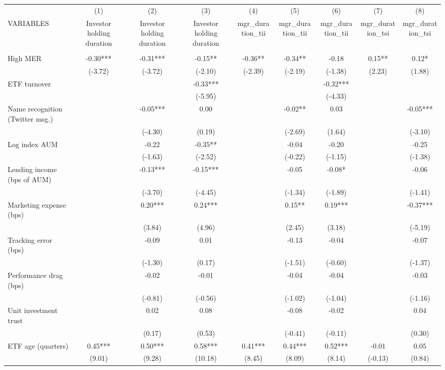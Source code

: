 \documentclass[]{article}
\begin{document}
\begin{tabular}{lcccccccc} \hline
 & (1) & (2) & (3) & (4) & (5) & (6) & (7) & (8) \\
VARIABLES & Investor holding duration & Investor holding duration & Investor holding duration & mgr\_duration\_tii & mgr\_duration\_tii & mgr\_duration\_tii & mgr\_duration\_tsi & mgr\_duration\_tsi \\ \hline
 &  &  &  &  &  &  &  &  \\
High MER & -0.30*** & -0.31*** & -0.15** & -0.36** & -0.34** & -0.18 & 0.15** & 0.12* \\
 & (-3.72) & (-3.72) & (-2.10) & (-2.39) & (-2.19) & (-1.38) & (2.23) & (1.88) \\
ETF turnover &  &  & -0.33*** &  &  & -0.32*** &  &  \\
 &  &  & (-5.95) &  &  & (-4.33) &  &  \\
Name recognition (Twitter msg.) &  & -0.05*** & 0.00 &  & -0.02** & 0.03 &  & -0.05*** \\
 &  & (-4.30) & (0.19) &  & (-2.69) & (1.64) &  & (-3.10) \\
Log index AUM &  & -0.22 & -0.35** &  & -0.04 & -0.20 &  & -0.25 \\
 &  & (-1.63) & (-2.52) &  & (-0.22) & (-1.15) &  & (-1.38) \\
Lending income (bps of AUM) &  & -0.13*** & -0.15*** &  & -0.05 & -0.08* &  & -0.06 \\
 &  & (-3.70) & (-4.45) &  & (-1.34) & (-1.89) &  & (-1.41) \\
Marketing expense (bps) &  & 0.20*** & 0.24*** &  & 0.15** & 0.19*** &  & -0.37*** \\
 &  & (3.84) & (4.96) &  & (2.45) & (3.18) &  & (-5.19) \\
Tracking error (bps) &  & -0.09 & 0.01 &  & -0.13 & -0.04 &  & -0.07 \\
 &  & (-1.30) & (0.17) &  & (-1.51) & (-0.60) &  & (-1.37) \\
Performance drag (bps) &  & -0.02 & -0.01 &  & -0.04 & -0.04 &  & -0.03 \\
 &  & (-0.81) & (-0.56) &  & (-1.02) & (-1.04) &  & (-1.16) \\
Unit investment trust &  & 0.02 & 0.08 &  & -0.08 & -0.02 &  & 0.04 \\
 &  & (0.17) & (0.53) &  & (-0.41) & (-0.11) &  & (0.30) \\
ETF age (quarters) & 0.45*** & 0.50*** & 0.58*** & 0.41*** & 0.44*** & 0.52*** & -0.01 & 0.05 \\
 & (9.01) & (9.28) & (10.18) & (8.45) & (8.09) & (8.14) & (-0.13) & (0.84) \\

\end{tabular}
\end{document}
